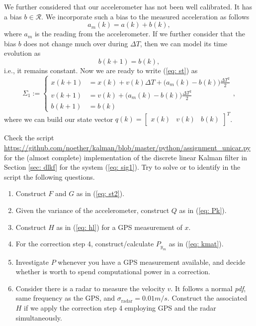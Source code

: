 \documentclass[11pt,a4paper]{article}
\begin{document}
We further considered that our accelerometer has not been well calibrated. It has a bias $b\in\mathcal{R}$. We incorporate such a bias to the measured acceleration as follows
\begin{equation}
	a_m(k) = a(k) + b(k),
	\label{eq: am}
\end{equation}
where $a_m$ is the reading from the accelerometer. If we further consider that the bias $b$ does not change much over during $\Delta T$, then we can model its time evolution as
\begin{equation}
	b(k+1) = b(k),
\end{equation}
i.e., it remains constant. Now we are ready to write (\ref{eq: st}) as
\begin{equation}
	\Sigma_1 := \begin{cases}
		x(k+1) &= x(k) + v(k)\Delta T + \big(a_m(k) - b(k)\big) \frac{\Delta T^2}{2} \\
		v(k+1) &= v(k) + \big(a_m(k) - b(k)\big)\frac{\Delta T^2}{2} \\
		b(k+1) &= b(k)
	\end{cases},\label{eq: sig1}
\end{equation}
where we can build our state vector $q(k) = \begin{bmatrix}x(k) & v(k) & b(k)\end{bmatrix}^T$.

Check the script \url{https://github.com/noether/kalman/blob/master/python/assignment_unicar.py} for the (almost complete) implementation of the discrete linear Kalman filter in Section \ref{sec: dlkf} for the system (\ref{eq: sig1}). Try to solve or to identify in the script the following questions.

\begin{enumerate}
	\item Construct $F$ and $G$ as in (\ref{eq: st2}).
	\item Given the variance of the accelerometer, construct $Q$ as in (\ref{eq: Pk}).
	\item Construct $H$ as in (\ref{eq: hl}) for a GPS measurement of $x$.
	\item For the correction step 4, construct/calculate $P_{y_m}$ as in (\ref{eq: kmat}).
	\item Investigate $P$ whenever you have a GPS measurement available, and decide whether is worth to spend computational power in a correction.
	\item Consider there is a radar to measure the velocity $v$. It follows a normal \emph{pdf}, same frequency as the GPS, and $\sigma_{\text{radar}} = 0.01 m/s$. Construct the associated $H$ if we apply the correction step 4 employing GPS and the radar simultaneously.
\end{enumerate}
\end{document}
